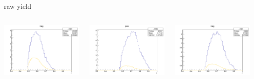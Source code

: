 \begin{frame}{raw yield}
\begin{columns}
\begin{column}[T]{0.25\textwidth}
\includegraphics[width = \textwidth]{results/yield/statistics/yield_x_Q2_z_0.60_4.775_0.60_neg.png}
\end{column}
\begin{column}[T]{0.25\textwidth}
\includegraphics[width = \textwidth]{results/yield/statistics/yield_x_Q2_z_0.60_4.775_0.70_pos.png}
\end{column}
\begin{column}[T]{0.25\textwidth}
\includegraphics[width = \textwidth]{results/yield/statistics/yield_x_Q2_z_0.60_4.775_0.70_neg.png}
\end{column}
\end{columns}
\end{frame}
